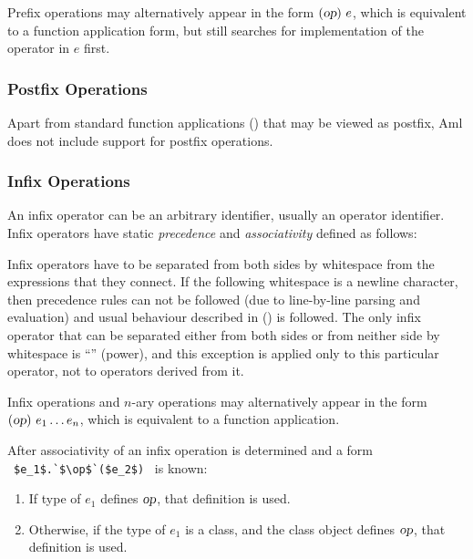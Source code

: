 Prefix operations may alternatively appear in the form $(\mbox{\sl op})\ e$, which is equivalent to a function application form, but still searches for implementation of the operator in $e$ first. 





\subsubsection{Postfix Operations}

Apart from standard function applications () that may be viewed as postfix, Aml does not include support for postfix operations. 





\subsubsection{Infix Operations}
\label{sec:infix-operations}

An infix operator can be an arbitrary identifier, usually an operator identifier. Infix operators have static {\em precedence} and {\em associativity} defined as follows:

Infix operators have to be separated from both sides by whitespace from the expressions that they connect. If the following whitespace is a newline character, then precedence rules can not be followed (due to line-by-line parsing and evaluation) and usual behaviour described in () is followed. The only infix operator that can be separated either from both sides or from neither side by whitespace is ``\code{^}'' (power), and this exception is applied only to this particular operator, not to operators derived from it. 

Infix operations and $n$-ary operations may alternatively appear in the form $(\mbox{\sl op})\ e_1 \ldots e_n$, which is equivalent to a function application. 

After associativity of an infix operation is determined and a form ~\lstinline!$e_1$.`$\op$`($e_2$)!~ is known:
\begin{enumerate}
  \item If type of $e_1$ defines $\mbox{\sl op}$, that definition is used. 
  \item Otherwise, if the type of $e_1$ is a class, and the class object defines $\mbox{\sl op}$, that definition is used. 
\end{enumerate}

